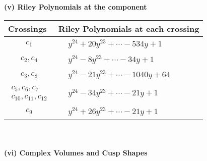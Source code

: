\documentclass[1p]{elsarticle_modified}
\theoremstyle{definition}
\begin{document}
\newpage\renewcommand{\arraystretch}{1}
\flushleft \textbf{(v) Riley Polynomials at the component}\newline \\
\begin{tabular}{m{50pt}|m{274pt}}
Crossings & \hspace{64pt}Riley Polynomials at each crossing \\
\hline $$\begin{aligned}c_{1}\end{aligned}$$&$\begin{aligned}
&y^{24}+20 y^{23}+\cdots-534 y+1
\end{aligned}$\\
\hline $$\begin{aligned}c_{2},c_{4}\end{aligned}$$&$\begin{aligned}
&y^{24}-8 y^{23}+\cdots-34 y+1
\end{aligned}$\\
\hline $$\begin{aligned}c_{3},c_{8}\end{aligned}$$&$\begin{aligned}
&y^{24}-21 y^{23}+\cdots-1040 y+64
\end{aligned}$\\
\hline $$\begin{aligned}c_{5},c_{6},c_{7}\\c_{10},c_{11},c_{12}\end{aligned}$$&$\begin{aligned}
&y^{24}-34 y^{23}+\cdots-21 y+1
\end{aligned}$\\
\hline $$\begin{aligned}c_{9}\end{aligned}$$&$\begin{aligned}
&y^{24}+26 y^{23}+\cdots-21 y+1
\end{aligned}$\\
\hline
\end{tabular}\\~\\
\newpage\flushleft \textbf{(vi) Complex Volumes and Cusp Shapes}
\end{document}

